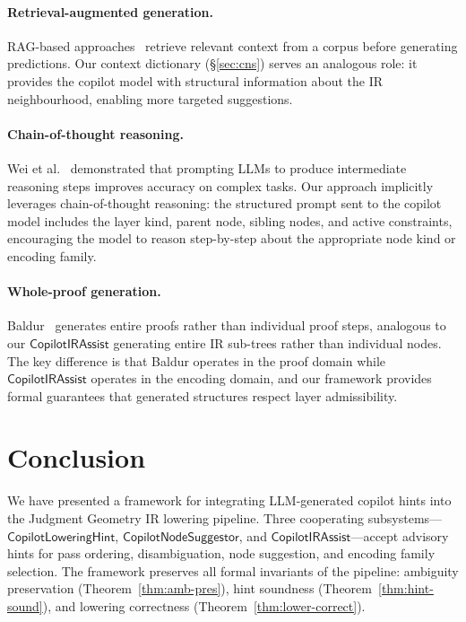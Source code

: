 \documentclass[11pt]{article}
\newcommand{\CLH}{\mathsf{CopilotLoweringHint}}
\newcommand{\CNS}{\mathsf{CopilotNodeSuggestor}}
\newcommand{\CIA}{\mathsf{CopilotIRAssist}}
\begin{document}
\paragraph{Retrieval-augmented generation.}
RAG-based approaches~\cite{yang2024leandojo,zheng2024opencodeinterpreter}
retrieve relevant context from a corpus before generating predictions.
Our context dictionary (\S\ref{sec:cns}) serves an analogous role: it
provides the copilot model with structural information about the IR
neighbourhood, enabling more targeted suggestions.

\paragraph{Chain-of-thought reasoning.}
Wei et al.~\cite{wei2022chain} demonstrated that prompting LLMs to
produce intermediate reasoning steps improves accuracy on complex
tasks.  Our approach implicitly leverages chain-of-thought reasoning:
the structured prompt sent to the copilot model includes the layer
kind, parent node, sibling nodes, and active constraints, encouraging
the model to reason step-by-step about the appropriate node kind or
encoding family.

\paragraph{Whole-proof generation.}
Baldur~\cite{First2023baldur} generates entire proofs rather than
individual proof steps, analogous to our $\CIA$ generating entire IR
sub-trees rather than individual nodes.  The key difference is that
Baldur operates in the proof domain while $\CIA$ operates in the
encoding domain, and our framework provides formal guarantees that
generated structures respect layer admissibility.

\section{Conclusion}\label{sec:conclusion}

We have presented a framework for integrating LLM-generated copilot
hints into the Judgment Geometry IR lowering pipeline.  Three
cooperating subsystems---$\CLH$, $\CNS$, and $\CIA$---accept advisory
hints for pass ordering, disambiguation, node suggestion, and encoding
family selection.  The framework preserves all formal invariants of the
pipeline: ambiguity preservation (Theorem~\ref{thm:amb-pres}), hint
soundness (Theorem~\ref{thm:hint-sound}), and lowering correctness
(Theorem~\ref{thm:lower-correct}).
\end{document}
